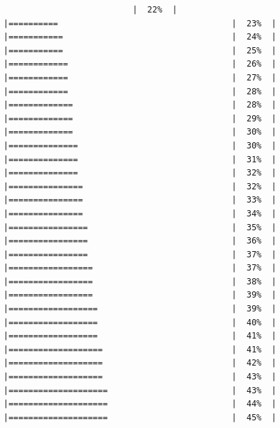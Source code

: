 \documentclass[
  krantz2]{krantz}
\begin{document}
\begin{verbatim}
                          |  22%  |                                                     |==========                                   |  23%  |                                                     |===========                                  |  24%  |                                                     |===========                                  |  25%  |                                                     |============                                 |  26%  |                                                     |============                                 |  27%  |                                                     |============                                 |  28%  |                                                     |=============                                |  28%  |                                                     |=============                                |  29%  |                                                     |=============                                |  30%  |                                                     |==============                               |  30%  |                                                     |==============                               |  31%  |                                                     |==============                               |  32%  |                                                     |===============                              |  32%  |                                                     |===============                              |  33%  |                                                     |===============                              |  34%  |                                                     |================                             |  35%  |                                                     |================                             |  36%  |                                                     |================                             |  37%  |                                                     |=================                            |  37%  |                                                     |=================                            |  38%  |                                                     |=================                            |  39%  |                                                     |==================                           |  39%  |                                                     |==================                           |  40%  |                                                     |==================                           |  41%  |                                                     |===================                          |  41%  |                                                     |===================                          |  42%  |                                                     |===================                          |  43%  |                                                     |====================                         |  43%  |                                                     |====================                         |  44%  |                                                     |====================                         |  45%  |                                            
\end{verbatim}
\end{document}
